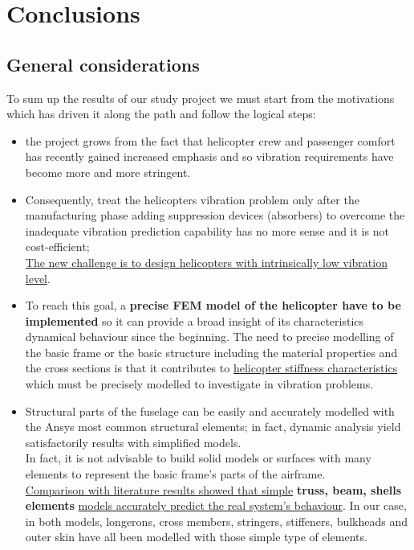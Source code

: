 \chapter{Conclusions}


\section*{General considerations}

\noindent
To sum up the results of our study project we must start from the motivations which has driven it along the path and follow the logical steps:

\begin{itemize}
	\item the project grows from the fact that helicopter crew and passenger comfort has recently gained increased emphasis and so vibration requirements have become more and more stringent.
	
	\item Consequently, treat the helicopters vibration problem only after the manufacturing phase adding suppression devices (absorbers) to overcome the inadequate vibration prediction capability has no more sense and it is not cost-efficient; \\ 
	\underline{The new challenge is to design helicopters with intrinsically low vibration level}.
	
	\item To reach this goal, a \textbf{precise FEM model of the helicopter have to be implemented} so it can provide a broad insight of its characteristics dynamical behaviour since the beginning. 
	The need to precise modelling of the basic frame or the basic structure including the material properties and the cross sections is that it contributes to \underline{helicopter stiffness characteristics} which must be precisely modelled to investigate in vibration problems.
	
	\item Structural parts of the fuselage can be easily and accurately modelled with the Ansys most common structural elements; in fact, dynamic analysis yield satisfactorily results with simplified models. \\
	In fact, it is not advisable to build solid models or surfaces with many elements to represent the basic frame's parts of the airframe. \\
	\underline{Comparison with literature results showed that simple} \textbf{truss, beam, shells elements} \underline{models accurately predict the real system's behaviour}. In our case, in both models, longerons, cross members, stringers, stiffeners, bulkheads and outer skin have all been modelled with those simple type of elements.
	

\end{itemize}
